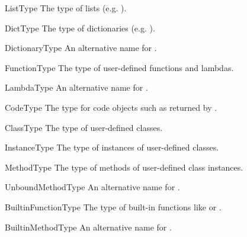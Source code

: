 \begin{datadesc}{ListType}
The type of lists (e.g. \code{[0, 1, 2, 3]}).
\end{datadesc}

\begin{datadesc}{DictType}
The type of dictionaries (e.g. ).
\end{datadesc}

\begin{datadesc}{DictionaryType}
An alternative name for .
\end{datadesc}

\begin{datadesc}{FunctionType}
The type of user-defined functions and lambdas.
\end{datadesc}

\begin{datadesc}{LambdaType}
	An alternative name for .
\end{datadesc}

\begin{datadesc}{CodeType}
The type for code objects such as returned by .
\end{datadesc}

\begin{datadesc}{ClassType}
The type of user-defined classes.
\end{datadesc}

\begin{datadesc}{InstanceType}
The type of instances of user-defined classes.
\end{datadesc}

\begin{datadesc}{MethodType}
The type of methods of user-defined class instances.
\end{datadesc}

\begin{datadesc}{UnboundMethodType}
An alternative name for .
\end{datadesc}

\begin{datadesc}{BuiltinFunctionType}
The type of built-in functions like  or .
\end{datadesc}

\begin{datadesc}{BuiltinMethodType}
An alternative name for .
\end{datadesc}

